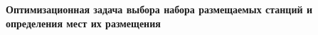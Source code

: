 \textbf{Оптимизационная задача выбора набора размещаемых станций и определения мест их размещения}







